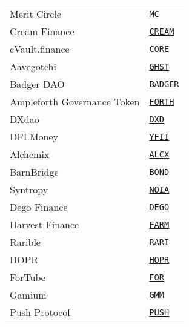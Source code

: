 \begin{tabular}{ll}
Merit Circle & \href{https://etherscan.io/address/0x949d48eca67b17269629c7194f4b727d4ef9e5d6}{\tt MC} \\
Cream Finance & \href{https://etherscan.io/address/0x2ba592f78db6436527729929aaf6c908497cb200}{\tt CREAM} \\
cVault.finance & \href{https://etherscan.io/address/0x62359ed7505efc61ff1d56fef82158ccaffa23d7}{\tt CORE} \\
Aavegotchi & \href{https://etherscan.io/address/0x3F382DbD960E3a9bbCeaE22651E88158d2791550}{\tt GHST} \\
Badger DAO & \href{https://etherscan.io/address/0x3472a5a71965499acd81997a54bba8d852c6e53d}{\tt BADGER} \\
Ampleforth Governance Token & \href{https://etherscan.io/address/0x77fba179c79de5b7653f68b5039af940ada60ce0}{\tt FORTH} \\
DXdao & \href{https://etherscan.io/address/0xa1d65e8fb6e87b60feccbc582f7f97804b725521}{\tt DXD} \\
DFI.Money & \href{https://etherscan.io/address/0xa1d0E215a23d7030842FC67cE582a6aFa3CCaB83}{\tt YFII} \\
Alchemix & \href{https://etherscan.io/address/0xdbdb4d16eda451d0503b854cf79d55697f90c8df}{\tt ALCX} \\
BarnBridge & \href{https://etherscan.io/address/0x0391D2021f89DC339F60Fff84546EA23E337750f}{\tt BOND} \\
Syntropy & \href{https://etherscan.io/address/0xa8c8CfB141A3bB59FEA1E2ea6B79b5ECBCD7b6ca}{\tt NOIA} \\
Dego Finance & \href{https://etherscan.io/address/0x3da932456d082cba208feb0b096d49b202bf89c8}{\tt DEGO} \\
Harvest Finance & \href{https://etherscan.io/address/0xa0246c9032bC3A600820415aE600c6388619A14D}{\tt FARM} \\
Rarible & \href{https://etherscan.io/address/0xfca59cd816ab1ead66534d82bc21e7515ce441cf}{\tt RARI} \\
HOPR & \href{https://etherscan.io/address/0xf5581dfefd8fb0e4aec526be659cfab1f8c781da}{\tt HOPR} \\
ForTube & \href{https://etherscan.io/address/0x1fcdce58959f536621d76f5b7ffb955baa5a672f}{\tt FOR} \\
Gamium & \href{https://etherscan.io/address/0x4B19C70Da4c6fA4bAa0660825e889d2F7eaBc279}{\tt GMM} \\
Push Protocol & \href{https://etherscan.io/address/0xf418588522d5dd018b425E472991E52EBBeEEEEE}{\tt PUSH} \\

\end{tabular}
